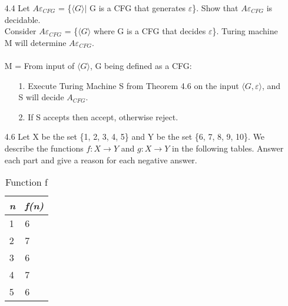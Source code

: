 \documentclass{scrartcl}
\begin{document}
\begin{enumerate}
	\item[4.4] Let $A\varepsilon_{CFG}$ = \{$\langle G\rangle$$|$ G is a CFG that generates $\varepsilon$\}. Show that $A\varepsilon_{CFG}$ is decidable.\\
	
	Consider $A\varepsilon_{CFG}$ = \{$\langle G\rangle$ where G is a CFG that decides $\varepsilon$\}. Turing machine M will determine $A\varepsilon_{CFG}$.\\ \\
	M = From input of $\langle G\rangle$, G being defined as a CFG:
	\begin{enumerate}
		\item[1.] Execute Turing Machine S from Theorem 4.6 on the input $\langle G, \varepsilon \rangle$, and S will decide $A_{CFG}$.
		
		\item[2.] If S accepts then accept, otherwise reject.\\

	\end{enumerate}
	\item[4.6] Let X be the set \{1, 2, 3, 4, 5\} and Y be the set \{6, 7, 8, 9, 10\}. We describe the functions $f : X\rightarrow Y$ and $g : X\rightarrow Y$ in the following tables. Answer each part and give a reason for each negative answer.\\
		\begin{table}[htb!]
			\centering
			\caption{Function f}
			\label{my-label}
			\begin{tabular}{|l|l|}
			\hline
				\textit{n} & \textit{f(n)} \\ \hline
				1 & 6 \\ \hline
				2 & 7 \\ \hline
				3 & 6 \\ \hline
				4 & 7 \\ \hline
				5 & 6 \\ \hline
			\end{tabular}
		\end{table}
		

\end{enumerate}
\end{document}
